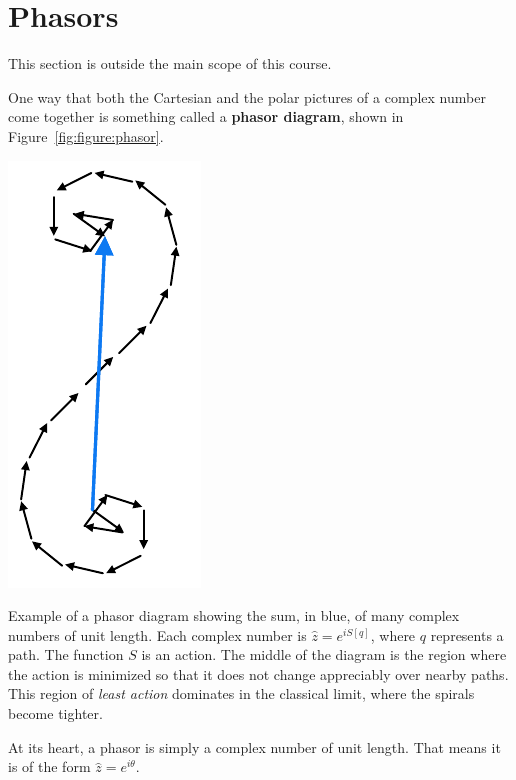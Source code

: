 \documentclass[12pt, oneside]{report}    %
\let\oldsection\section
\def\section{%
  \setcounter{sidenote}{1}%
  \oldsection
}
\begin{document}
\section{Phasors}

This section is outside the main scope of this course.

One way that both the Cartesian and the polar pictures of a complex number come together is something called a \textbf{phasor diagram}, shown in Figure~\ref{fig:figure:phasor}.
\begin{marginfigure}%
    \includegraphics[width=.5\textwidth]{figures/Phasor.pdf}
    \caption{Example of a phasor diagram showing the sum, in blue, of many complex numbers of unit length. Each complex number is $\hat z = e^{iS[q]}$, where $q$ represents a path. The function $S$ is an action. The middle of the diagram is the region where the action is minimized so that it does not change appreciably over nearby paths. This region of \emph{least action} dominates in the classical limit, where the spirals become tighter.}
    \label{fig:figure:phasor}
\end{marginfigure}
At its heart, a phasor is simply a complex number of unit length. That means it is of the form $\hat z = e^{i\theta}$. 
\end{document}
